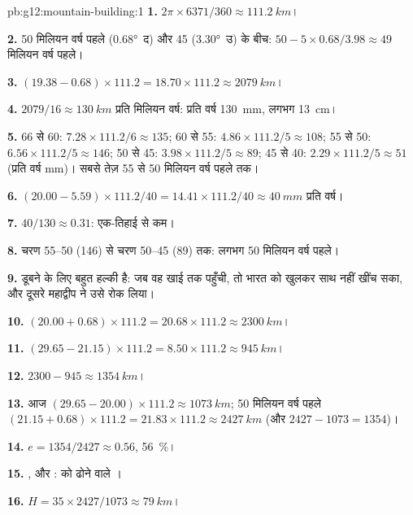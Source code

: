 \begin{solution}{pb:g12:mountain-building:1}
\textbf{1.} $2\pi \times 6371/360 \approx \qty{111.2}{km}$।

\textbf{2.} 50 मिलियन वर्ष पहले (\ang{0.68}~द) और 45 (\ang{3.30}~उ) के बीच:
$50 - 5 \times 0.68/3.98 \approx 49$ मिलियन वर्ष पहले।

\textbf{3.} $(19.38 - 0.68) \times 111.2 = 18.70 \times 111.2 \approx
\qty{2079}{km}$।

\textbf{4.} $2079/16 \approx \qty{130}{km}$ प्रति मिलियन वर्ष: प्रति वर्ष \qty{130}{mm},
लगभग \qty{13}{cm}।

\textbf{5.} 66 से 60: $7.28 \times 111.2/6 \approx 135$; 60 से 55: $4.86
\times 111.2/5 \approx 108$; 55 से 50: $6.56 \times 111.2/5 \approx 146$; 50
से 45: $3.98 \times 111.2/5 \approx 89$; 45 से 40: $2.29 \times 111.2/5
\approx 51$ (प्रति वर्ष \unit{mm})। सबसे तेज़ 55 से 50 मिलियन वर्ष पहले तक।

\textbf{6.} $(20.00 - 5.59) \times 111.2/40 = 14.41 \times 111.2/40 \approx
\qty{40}{mm}$ प्रति वर्ष।

\textbf{7.} $40/130 \approx 0.31$: एक-तिहाई से कम।

\textbf{8.} चरण 55--50 (146) से चरण 50--45 (89) तक: लगभग 50
मिलियन वर्ष पहले।

\textbf{9.}  डूबने के लिए बहुत हल्की है: जब वह
खाई तक पहुँची, तो  भारत को खुलकर साथ नहीं खींच सका, और दूसरे
महाद्वीप ने उसे रोक लिया।

\textbf{10.} $(20.00 + 0.68) \times 111.2 = 20.68 \times 111.2 \approx
\qty{2300}{km}$।

\textbf{11.} $(29.65 - 21.15) \times 111.2 = 8.50 \times 111.2 \approx
\qty{945}{km}$।

\textbf{12.} $2300 - 945 \approx \qty{1354}{km}$।

\textbf{13.} आज $(29.65 - 20.00) \times 111.2 \approx \qty{1073}{km}$;
50 मिलियन वर्ष पहले $(21.15 + 0.68) \times 111.2 = 21.83 \times 111.2
\approx \qty{2427}{km}$ (और $2427 - 1073 = 1354$)।

\textbf{14.} $e = 1354/2427 \approx 0.56$, \qty{56}{\percent}।

\textbf{15.} , और :  को ढोने वाले ।

\textbf{16.} $H = 35 \times 2427/1073 \approx \qty{79}{km}$।


\end{solution}
